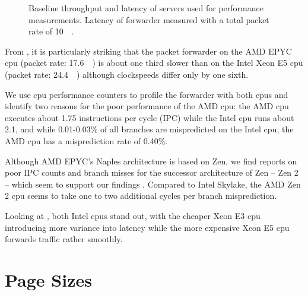 \begin{figure}%
	\centering

    \caption{Baseline throughput and latency of servers used for performance
    measurements. Latency of forwarder measured with a total packet rate of
    \SI{10}{\mega\pps}.}
	\label{fig:baseline-perf}
\end{figure}

From , it is particularly striking that the
packet forwarder on the AMD EPYC \ac{cpu} (packet rate: \SI{17.6}{\mega\pps}) is
about one third slower than on the Intel Xeon E5 \ac{cpu} (packet rate:
\SI{24.4}{\mega\pps}) although clockspeeds differ only by one sixth.

We use \ac{cpu} performance counters to profile the forwarder with both
\acp{cpu} and identify two reasons for the poor performance of the AMD \ac{cpu}:
the AMD \ac{cpu} executes about 1.75 instructions per cycle (IPC) while the
Intel \ac{cpu} runs about 2.1, and while 0.01-0.03\% of all branches are
mispredicted on the Intel \ac{cpu}, the AMD \ac{cpu} has a misprediction rate of
0.40\%.

Although AMD EPYC's Naples architecture is based on Zen, we find reports on poor
IPC counts and branch misses for the successor architecture of Zen -- Zen 2 --
which seem to support our findings \cite{lemire2019instructions,
lemire2019mispredictions}. Compared to Intel Skylake, the AMD Zen 2 \ac{cpu}
seems to take one to two additional cycles per branch misprediction.

Looking at , both Intel \acp{cpu} stand out,
with the cheaper Xeon E3 \ac{cpu} introducing more variance into latency while
the more expensive Xeon E5 \ac{cpu} forwards traffic rather smoothly.


\section{Page Sizes}
\label{sec:page_sizes}

